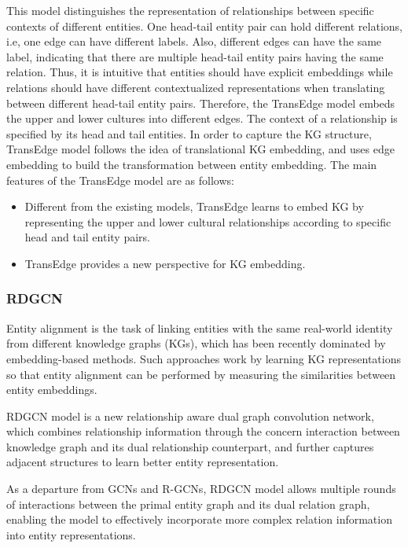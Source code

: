 \documentclass[sigconf]{acmart}
\begin{document}
{This model distinguishes the representation of relationships between specific contexts of different entities. One head-tail entity pair can hold different relations, i.e, one edge can have different labels. Also, different edges can have the same label, indicating that there are multiple head-tail entity pairs having the same relation. Thus, it is intuitive that entities should have explicit embeddings while relations should have different contextualized representations when translating between different head-tail entity pairs. Therefore, the TransEdge model embeds the upper and lower cultures into different edges. The context of a relationship is specified by its head and tail entities. In order to capture the KG structure, TransEdge model follows the idea of translational KG embedding, and uses edge embedding to build the transformation between entity embedding.
The main features of the TransEdge model are as follows:
\begin{itemize}
\item Different from the existing models, TransEdge learns to embed KG by representing the upper and lower cultural relationships according to specific head and tail entity pairs.
\item TransEdge provides a new perspective for KG embedding.
\end{itemize}

\subsubsection{RDGCN \cite{wu2019relation}}

Entity alignment is the task of linking entities with the same real-world identity from different knowledge graphs (KGs), which has been recently dominated by embedding-based methods. Such approaches work by learning KG representations so that entity alignment can be performed by measuring the similarities between entity embeddings.

RDGCN model is a new relationship aware dual graph convolution network, which combines relationship information through the concern interaction between knowledge graph and its dual relationship counterpart, and further captures adjacent structures to learn better entity representation.

As a departure from GCNs and R-GCNs, RDGCN model allows multiple rounds of interactions between the primal entity graph and its dual relation graph, enabling the model to effectively incorporate more complex relation information into entity representations. 

}
\end{document}
